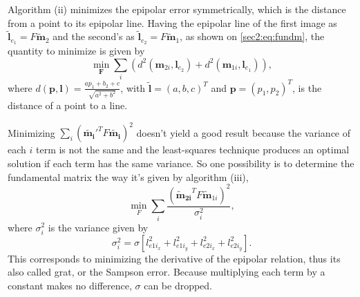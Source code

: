 Algorithm (ii) minimizes the epipolar error symmetrically, which is the distance from a point to its epipolar line. Having the epipolar line of the first image as $\widetilde{\mathbf{l}}_{e_1} =  F\widetilde{\mathbf{m}}_{2}$ and the second's as $\widetilde{\mathbf{l}}_{e_2} =  F\widetilde{\mathbf{m}}_{1}$, as shown on \ref{sec2:eq:fundm}, the quantity to minimize is given by
\begin{equation}
	\min _{\mathbf{F}} \sum_{i}\left(d^{2}\left(\mathbf{m}_{2i}, \mathbf{l}_{e_{2}}\right)+d^{2}\left(\mathbf{m}_{1i}, \mathbf{l}_{e_{1}}\right)\right),
\end{equation}
where $d\left(\mathbf{p}, \mathbf{l}\right)=\frac{a p_{1}+b _{2}+c}{\sqrt{a^{2}+b^{2}}}$, with $\widetilde{\mathbf{l}} = (a, b, c)^{T}$
and $\mathbf{p}=\left(p_{1}, p_{2}\right)^{T}$, is the distance of a point to a line.

Minimizing $ \sum_i (\mathbf{\widetilde{m_i}}'^T F \mathbf{\widetilde{m_i}})^2$ doesn't yield a good result because the variance of each $i$ term is not the same and the least-squares technique produces an optimal solution if each term has the same variance. So one possibility is to determine the fundamental matrix the way it's given by algorithm (iii), 
\begin{equation}
\min_F \sum_i \frac{ (\mathbf{\widetilde{\mathbf{m}}_{2i}}^T F \widetilde{\mathbf{m}}_{1i})^2}{\sigma_i^2},
\end{equation}
where $\sigma_i^2$ is the variance given by 
\begin{equation}
\sigma_i^2 = \sigma [l_{{e1i}_x}^2 + l_{{e1i}_y}^2 + l_{{e2i}_x}^2 + l_{{e2i}_y}^2].
\end{equation}
This corresponds to minimizing the derivative of the epipolar relation, thus its also called \acrfull{grat}, or the Sampson error.
Because multiplying each term by a constant makes no difference, $\sigma$ can be dropped. 

